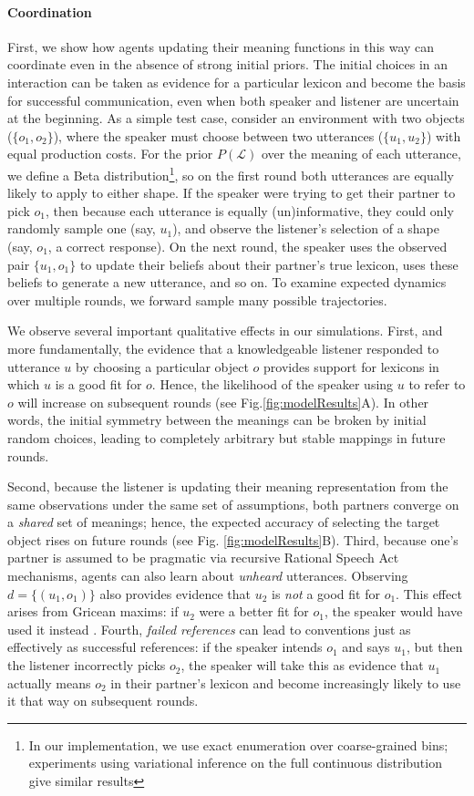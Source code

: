\paragraph{Coordination}
First, we show how agents updating their meaning functions in this way can coordinate even in the absence of strong initial priors. 
The initial choices in an interaction can be taken as evidence for a particular lexicon and become the basis for successful communication, even when both speaker and listener are uncertain at the beginning.
As a simple test case, consider an environment with two objects ($\{o_1, o_2\}$), where the speaker must choose between two utterances ($\{u_1, u_2\}$) with equal production costs. 
For the prior $P(\mathcal{L})$ over the meaning of each utterance, we define a Beta distribution\footnote{In our implementation, we use exact enumeration over coarse-grained bins; experiments using variational inference on the full continuous distribution give similar results}, so on the first round both utterances are equally likely to apply to either shape. 
If the speaker were trying to get their partner to pick $o_1$, then because each utterance is equally (un)informative, they could only randomly sample one (say, $u_1$), and observe the listener's selection of a shape (say, $o_1$, a correct response). 
On the next round, the speaker uses the observed pair $\{u_1, o_1\}$ to update their beliefs about their partner's true lexicon, uses these beliefs to generate a new utterance, and so on. 
To examine expected dynamics over multiple rounds, we forward sample many possible trajectories.

We observe several important qualitative effects in our simulations. 
First, and more fundamentally, the evidence that a knowledgeable listener responded to utterance $u$ by choosing a particular object $o$ provides support for lexicons in which $u$ is a good fit for $o$. 
Hence, the likelihood of the speaker using $u$ to refer to $o$ will increase on subsequent rounds (see Fig.\ref{fig:modelResults}A). 
In other words, the initial symmetry between the meanings can be broken by initial random choices, leading to completely arbitrary but stable mappings in future rounds. 

Second, because the listener is updating their meaning representation from the same observations under the same set of assumptions, both partners converge on a \emph{shared} set of meanings; hence, the expected accuracy of selecting the target object rises on future rounds (see Fig. \ref{fig:modelResults}B). 
Third, because one's partner is assumed to be pragmatic via recursive Rational Speech Act mechanisms, agents can also learn about \emph{unheard} utterances. 
Observing $d = \{(u_1, o_1)\}$ also provides evidence that $u_2$ is \emph{not} a good fit for $o_1$.
This effect arises from Gricean maxims: if $u_2$ were a better fit for $o_1$, the speaker would have used it instead \cite{Grice75_LogicConversation}. 
Fourth, \emph{failed references} can lead to conventions just as effectively as successful references: if the speaker intends $o_1$ and says $u_1$, but then the listener incorrectly picks $o_2$, the speaker will take this as evidence that $u_1$ actually means $o_2$ in their partner's lexicon and become increasingly likely to use it that way on subsequent rounds.

